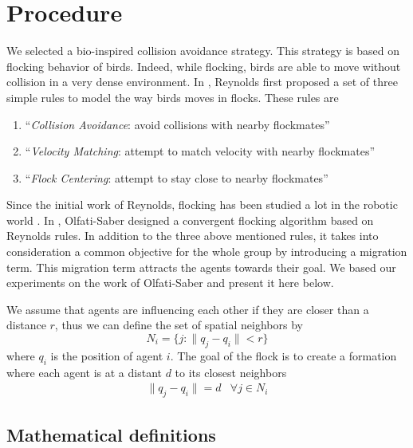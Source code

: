 \section{Procedure}

We selected a bio-inspired collision avoidance strategy. This strategy is based on flocking behavior of birds. Indeed, while flocking, birds are able to move without collision in a very dense environment. In \cite{reynolds_flocks_1987}, Reynolds first proposed a set of three simple rules to model the way birds moves in flocks. These rules are
\begin{enumerate}
 \item ``\emph{Collision Avoidance}: avoid collisions with nearby flockmates''
 \item ``\emph{Velocity Matching}: attempt to match velocity with nearby flockmates''
 \item ``\emph{Flock Centering}: attempt to stay close to nearby flockmates''
\end{enumerate}

Since the initial work of Reynolds, flocking has been studied a lot in the robotic world \cite{hauert_reynolds_2011, lindhe_flocking_2005, viragh_flocking_2013}. In \cite{olfati-saber_flocking_2006}, Olfati-Saber designed a convergent flocking algorithm based on Reynolds rules. In addition to the three above mentioned rules, it takes into consideration a common objective for the whole group by introducing a migration term. This migration term attracts the agents towards their goal. We based our experiments on the work of Olfati-Saber and present it here below. 

We assume that agents are influencing each other if they are closer than a distance $r$, thus we can define the set of spatial neighbors by
\begin{equation}
N_i=\{j:\|q_j-q_i\|<r\}
\label{eq:Ni}
\end{equation}
where $q_i$ is the position of agent $i$. 
The goal of the flock is to create a formation where each agent is at a distant $d$ to its closest neighbors
\begin{equation}
\begin{array}{ll}
\|q_j-q_i\|=d & \forall j \in N_i
\end{array}
\label{eq:lattice}
\end{equation}

\subsection{Mathematical definitions}

